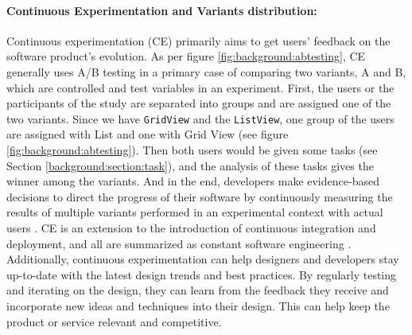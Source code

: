 \paragraph{Continuous Experimentation and Variants distribution:} 
Continuous experimentation (CE) primarily aims to get users' feedback on the software product's evolution.
As per figure \ref{fig:background:abtesting}, CE generally uses A/B testing in a primary case of comparing two variants, A and B, which are controlled and test variables in an experiment.
First, the users or the participants of the study are separated into groups and are assigned one of the two variants.
Since we have \texttt{GridView} and the \texttt{ListView}, one group of the users are assigned with List and one with Grid View (see figure \ref{fig:background:abtesting}).
Then both users would be given some tasks (see Section \ref{background:section:task}), and the analysis of these tasks gives the winner among the variants.  
And in the end, developers make evidence-based decisions to direct the progress of their software by continuously measuring the results of multiple variants performed in an experimental context with actual users \cite{article:CE:ros}.
CE is an extension to the introduction of continuous integration and deployment, and all are summarized as constant software engineering \cite{article:CE:fitzgerald}.
Additionally, continuous experimentation can help designers and developers stay up-to-date with the latest design trends and best practices. By regularly testing and iterating on the design, they can learn from the feedback they receive and incorporate new ideas and techniques into their design. 
This can help keep the product or service relevant and competitive.\\

